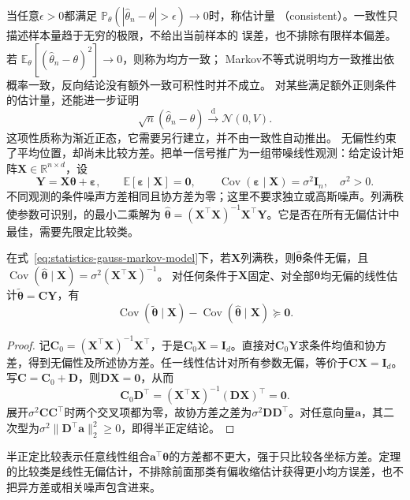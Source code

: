 当任意\(\epsilon>0\)都满足
\(\mathbb{P}_\theta(|\widehat\theta_n-\theta|>\epsilon)\to0\)时，称估计量
（consistent）。一致性只描述样本量趋于无穷的极限，不给出当前样本的
误差，也不排除有限样本偏差。若
\(\mathbb{E}_\theta[(\widehat\theta_n-\theta)^2]\to0\)，则称为均方一致；
Markov不等式说明均方一致推出依概率一致，反向结论没有额外一致可积性时并不成立。
对某些满足额外正则条件的估计量，还能进一步证明
\[
  \sqrt n(\widehat\theta_n-\theta)
  \xrightarrow{\mathrm d}\mathcal N(0,V).
\]
这项性质称为渐近正态，它需要另行建立，并不由一致性自动推出。
无偏性约束了平均位置，却尚未比较方差。把单一信号推广为一组带噪线性观测：给定设计矩阵\(\bm X\in\mathbb R^{n\times d}\)，设
\begin{equation}
  \bm Y=\bm X\bm\theta+\bm\varepsilon,\qquad
  \mathbb E[\bm\varepsilon\mid\bm X]=\bm0,\qquad
  \operatorname{Cov}(\bm\varepsilon\mid\bm X)=\sigma^2\bm I_n,
  \quad\sigma^2>0.
  \label{eq:statistics-gauss-markov-model}
\end{equation}
不同观测的条件噪声方差相同且协方差为零；这里不要求独立或高斯噪声。列满秩使参数可识别，的最小二乘解为
\(\widehat{\bm\theta}=(\bm X^\top\bm X)^{-1}\bm X^\top\bm Y\)。它是否在所有无偏估计中最佳，需要先限定比较类。
\begin{theorem}
  \label{thm:statistics-gauss-markov}
  在式~\eqref{eq:statistics-gauss-markov-model}下，若\(\bm X\)列满秩，则\(\widehat{\bm\theta}\)条件无偏，且
  \(\operatorname{Cov}(\widehat{\bm\theta}\mid\bm X)=\sigma^2(\bm X^\top\bm X)^{-1}\)。
  对任何条件于\(\bm X\)固定、对全部\(\bm\theta\)均无偏的线性估计\(\widetilde{\bm\theta}=\bm C\bm Y\)，有
  \[
    \operatorname{Cov}(\widetilde{\bm\theta}\mid\bm X)
    -\operatorname{Cov}(\widehat{\bm\theta}\mid\bm X)\succeq\bm0.
  \]
\end{theorem}
\begin{proof}
记\(\bm C_0=(\bm X^\top\bm X)^{-1}\bm X^\top\)，于是\(\bm C_0\bm X=\bm I_d\)。直接对\(\bm C_0\bm Y\)求条件均值和协方差，得到无偏性及所述协方差。任一线性估计对所有参数无偏，等价于\(\bm C\bm X=\bm I_d\)。写\(\bm C=\bm C_0+\bm D\)，则\(\bm D\bm X=\bm0\)，从而
\[
  \bm C_0\bm D^\top
  =(\bm X^\top\bm X)^{-1}(\bm D\bm X)^\top=\bm0.
\]
展开\(\sigma^2\bm C\bm C^\top\)时两个交叉项都为零，故协方差之差为\(\sigma^2\bm D\bm D^\top\)。对任意向量\(\bm a\)，其二次型为\(\sigma^2\|\bm D^\top\bm a\|_2^2\geq0\)，即得半正定结论。
\end{proof}
半正定比较表示任意线性组合\(\bm a^\top\bm\theta\)的方差都不更大，强于只比较各坐标方差。定理的比较类是线性无偏估计，不排除前面那类有偏收缩估计获得更小均方误差，也不把异方差或相关噪声包含进来。

